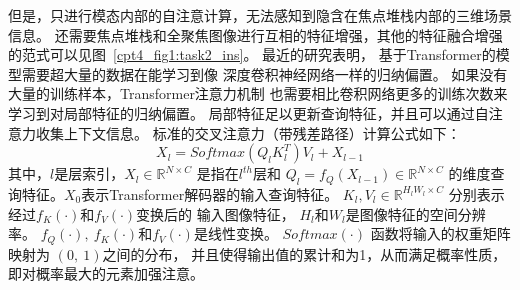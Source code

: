 但是，只进行模态内部的自注意计算，无法感知到隐含在焦点堆栈内部的三维场景信息。
还需要焦点堆栈和全聚焦图像进行互相的特征增强，其他的特征融合增强的范式可以见图~\ref{cpt4_fig1:task2_ins}。
最近的研究表明，
基于Transformer的模型需要超大量的数据在能学习到像
深度卷积神经网络一样的归纳偏置。
如果没有大量的训练样本，Transformer注意力机制
也需要相比卷积网络更多的训练次数来学习到对局部特征的归纳偏置。
局部特征足以更新查询特征，并且可以通过自注意力收集上下文信息。
标准的交叉注意力（带残差路径）计算公式如下：
\begin{equation}
	X_{l}=Softmax(Q_{l}K_{l}^{T})V_{l} + X_{l-1}
\end{equation}
其中，$l$是层索引，$X_{l} \in \mathbb{R}^{N\times C}$
是指在$l^{th}$层和
$ Q_{l} = f_{Q} \left ( X_{l-1} \right ) \in \mathbb{R}^{N \times C} $
的维度查询特征。$X_{0}$表示Transformer解码器的输入查询特征。
$K_{l},V_{l} \in \mathbb{R}^{H_{l}W_{l} \times C}$
分别表示经过$f_{K}(\cdot) $和$ f_{V}( \cdot )$变换后的
输入图像特征，
$H_{l}$和$W_{l}$是图像特征的空间分辨率。
$f_{Q} (\cdot),~f_{K}(\cdot) $和$ f_{V}(\cdot) $是线性变换。
$ Softmax(\cdot) $ 函数将输入的权重矩阵映射为 $(0,~1)$之间的分布，
并且使得输出值的累计和为1，从而满足概率性质，即对概率最大的元素加强注意。























